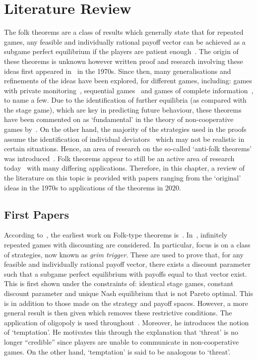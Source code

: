 \chapter{Literature Review}\label{ch:Lit_Review}

The folk theorems are a class of results which generally state that for repeated
games, any feasible and individually rational payoff vector can be achieved as a
subgame perfect equilibrium if the players are patient enough~\cite{Li2019}. The
origin of these theorems is unknown however written proof and
research involving these ideas first appeared
in~\cite{aumann1976long,Friedman1971,Rubinstein1979} in the 1970s. Since then,
many generalisations and refinements of
the ideas have been explored, for different games, including:
games with private monitoring~\cite{Hoerner2006,Matsushima2004, Peski2012}, sequential
games~\cite{Bhaskar1998,Gossner1996,Wen2002} and games of complete
information~\cite{Abreu1994,Benoit_1985,Bernergard2019}, to
name a few. Due to the identification of further equilibria (as compared with
the stage game), which are key in predicting future behaviour, these theorems
have been commented on as `fundamental' in the theory of non-cooperative
games by~\cite{Hoerner2006, Li2015}. On the other hand, the majority of the strategies used in the
proofs assume the identification of individual deviators~\cite{Masso1989} which may not
be realistic in certain situations. Hence, an area of research on the so-called
`anti-folk theorems' was introduced~\cite{Masso1989,Peski2012,Yoon2001}. Folk theorems appear to still be an
active area of research today~\cite{Ikeda2020, Parras2020, Wang2020} with many differing applications.
Therefore, in this chapter, a review of the literature on this topic is provided
with papers ranging from the `original' ideas in the 1970s to applications of
the theorems in 2020. 


\section{First Papers}\label{sec:First_Papers}
According to~\cite{Abreu1994}, the earliest work on Folk-type theorems is~\cite{Friedman1971}. In~\cite{Friedman1971}, infinitely repeated games with
discounting are considered. In particular, focus is on a class of strategies,
now known as \emph{grim trigger}. These are used to prove that, for any feasible
and individually rational payoff vector, there exists a discount parameter such
that a subgame perfect equilibrium with payoffs equal to that vector exist. This
is first shown under the constraints of: identical stage games, constant
discount parameter and unique Nash equilibrium that is not Pareto optimal. This
is in addition to those made on the strategy and payoff spaces. However, a more
general result is then given which removes these restrictive conditions.
The application of oligopoly is used throughout~\cite{Friedman1971}. Moreover,
he introduces the notion of `temptation'. He motivates this through the
explanation that `threat' is no longer ``credible'' since players are unable to
communicate in non-cooperative games. On the other hand, `temptation' is said to be analogous to `threat'.

